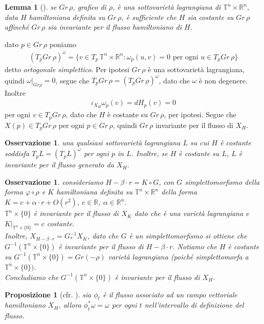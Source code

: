\documentclass[twoside, 11pt]{amsbook}
\makeatletter
\newcommand{\0}{{(0)}}
\newcommand{\3}{{(3)}}
\theoremstyle{colonplain}
\newtheorem{prop}[thm]{Proposizione}
\newtheorem{lemma}[thm]{Lemma}
\theoremstyle{colondefinition}
\theoremstyle{colonremark}
\newtheorem{rmk}[thm]{Osservazione}
\numberwithin{equation}{chapter}
\renewcommand{\proofname}{Dimostrazione}
\renewenvironment{proof}[1][\proofname]{\par
  \pushQED{\qed}%
  \normalfont \topsep6\p@\@plus6\p@\relax
  \trivlist
  \item[\hskip\labelsep\bfseries #1:]\ignorespaces
}{%
  \popQED\endtrivlist\@endpefalse
}
\makeatother
\begin{document}
\begin{lemma}[\cite{Bost}]\label{LemBost} se $Gr \, \rho$, grafico di $\rho$, è una sottovarietà lagrangiana di $\mathbb{T}^n \times \mathbb{R}^n$, data $H$ hamiltoniana definita su $Gr \, \rho$, è sufficiente che $H$ sia costante su $Gr \, \rho$ affinché $Gr \, \rho$ sia invariante per il flusso hamiltoniano di $H$.
\end{lemma}

\begin{proof} dato $p \in Gr \, \rho$ poniamo
\begin{align}
    (T_pGr \, \rho)^\omega = \{v \in T_p \, \mathbb{T}^n \times \mathbb{R}^n : \omega_p(u, v) = 0 \text{ per ogni } u \in T_pGr \, \rho\}
\end{align}
detto \textit{ortogonale simplettico}. Per ipotesi $Gr \, \rho$ è una sottovarietà lagrangiana, quindi $\omega|_{Gr \rho} = 0$, segue che $T_pGr \, \rho = (T_pGr \, \rho)^\omega$, dato che $\omega$ è non degenere. Inoltre
\begin{align}
    \iota_{X_H}\omega_p(v) = dH_p(v) = 0
\end{align}
per ogni $v \in T_pGr \, \rho$, dato che $H$ è costante su $Gr \, \rho$, per ipotesi. Segue che $X(p) \in T_pGr \, \rho$ per ogni $p \in Gr \, \rho$, quindi $Gr \, \rho$ invariante per il flusso di $X_H$. 
\end{proof}
\begin{rmk} una qualsiasi sottovarietà lagrangiana $L$ su cui $H$ è costante soddisfa $T_pL = (T_pL)^\omega$ per ogni $p$ in $L$. Inoltre, se $H$ è costante su $L$, $L$ è invariante per il flusso generato da $X_H$.
\end{rmk}
\begin{rmk} consideriamo $H - \beta \cdot r = K \circ G$, con $G$ simplettomorfismo della forma $\varphi \circ \rho$ e $K$ hamiltoniana definita su $\mathbb{T}^n \times \mathbb{R}^n$ della forma $K = c + \alpha \cdot r + O(r^2)$, $c \in \mathbb{R}$, $\alpha \in \mathbb{R}^n$. \\
$\mathbb{T}^n \times \{0\}$ è invariante per il flusso di $X_K$ dato che è una varietà lagrangiana e $K|_{\mathbb{T}^n \times \{0\}} = c$ costante. \\
Inoltre, $X_{H - \beta \cdot r} = G^{-1}_*X_K$, dato che $G$ è un simplettomorfismo si ottiene che $G^{-1}(\mathbb{T}^n \times \{0\})$ è invariante per il flusso di $H - \beta \cdot r$. Notiamo che $H$ è costante su $G^{-1}(\mathbb{T}^n \times \{0\}) = Gr(-\rho)$ varietà lagrangiana (poiché simplettomorfa a $\mathbb{T}^n \times \{0\})$. \\ 
Concludiamo che $G^{-1}(\mathbb{T}^n \times \{0\})$ è invariante per il flusso di $X_H$.
\end{rmk}
\begin{prop}[cfr. \cite{Fejoz01}] sia $\phi_t$ è il flusso associato ad un campo vettoriale hamiltoniano $X_H$, allora $\phi^*_t\omega = \omega$ per ogni $t$ nell'intervallo di definizione del flusso.
\end{prop}
\end{document}
